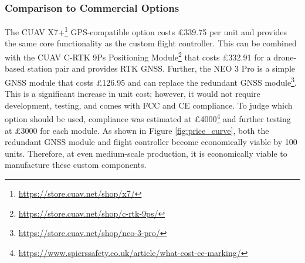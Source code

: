 \subsubsection{Comparison to Commercial Options}\label{sub_sub_section:tgt_commercial_options}

The CUAV X7+\footnote{\url{https://store.cuav.net/shop/x7/}} GPS-compatible option costs £339.75 per unit and provides the same core functionality as the custom flight controller. This can be combined with the CUAV C-RTK 9Ps Positioning Module\footnote{\url{https://store.cuav.net/shop/c-rtk-9ps/}} that costs £332.91 for a drone-based station pair and provides \gls{RTK} \gls{GNSS}. Further, the NEO 3 Pro is a simple \gls{GNSS} module that costs £126.95 and can replace the redundant \gls{GNSS} module\footnote{\url{https://store.cuav.net/shop/neo-3-pro/}}. This is a significant increase in unit cost; however, it would not require development, testing, and comes with FCC and CE compliance. To judge which option should be used, compliance was estimated at £4000\footnote{\url{https://www.spierssafety.co.uk/article/what-cost-ce-marking/}} and further testing at £3000 for each module. As shown in Figure \ref{fig:price_curve}, both the redundant \gls{GNSS} module and flight controller become economically viable by 100 units. Therefore, at even medium-scale production, it is economically viable to manufacture these custom components.